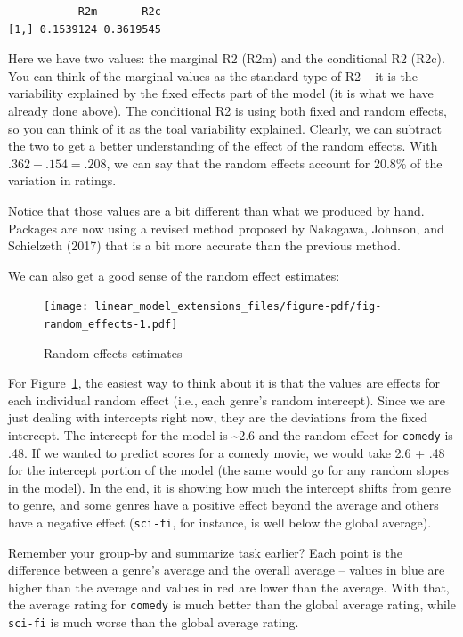 \documentclass[
  letterpaper,
]{krantz}
\begin{document}
\begin{verbatim}
           R2m       R2c
[1,] 0.1539124 0.3619545
\end{verbatim}

Here we have two values: the marginal R2 (R2m) and the conditional R2
(R2c). You can think of the marginal values as the standard type of R2
-- it is the variability explained by the fixed effects part of the
model (it is what we have already done above). The conditional R2 is
using both fixed and random effects, so you can think of it as the toal
variability explained. Clearly, we can subtract the two to get a better
understanding of the effect of the random effects. With
\(.362 - .154 = .208\), we can say that the random effects account for
20.8\% of the variation in ratings.

Notice that those values are a bit different than what we produced by
hand. Packages are now using a revised method proposed by Nakagawa,
Johnson, and Schielzeth (2017) that is a bit more accurate than the
previous method.

We can also get a good sense of the random effect estimates:

\begin{figure}

{\centering \texttt{[image: linear\_model\_extensions\_files/figure-pdf/fig-random\_effects-1.pdf]}

}

\caption{\label{fig-random_effects}Random effects estimates}

\end{figure}

For Figure~\ref{fig-random_effects}, the easiest way to think about it
is that the values are effects for each individual random effect (i.e.,
each genre's random intercept). Since we are just dealing with
intercepts right now, they are the deviations from the fixed intercept.
The intercept for the model is \textasciitilde2.6 and the random effect
for \texttt{comedy} is .48. If we wanted to predict scores for a comedy
movie, we would take 2.6 + .48 for the intercept portion of the model
(the same would go for any random slopes in the model). In the end, it
is showing how much the intercept shifts from genre to genre, and some
genres have a positive effect beyond the average and others have a
negative effect (\texttt{sci-fi}, for instance, is well below the global
average).

Remember your group-by and summarize task earlier? Each point is the
difference between a genre's average and the overall average -- values
in blue are higher than the average and values in red are lower than the
average. With that, the average rating for \texttt{comedy} is much
better than the global average rating, while \texttt{sci-fi} is much
worse than the global average rating.
\end{document}
